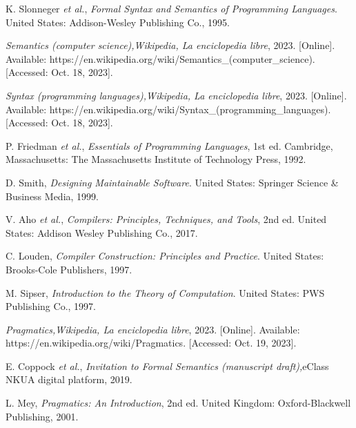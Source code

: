 \begin{thebibliography}{11}
    \label{sec:27}
    \hypertarget{27}{}
    K. Slonneger \textit{et al.}, \textit{Formal Syntax and Semantics of Programming Languages}. United States: Addison-Wesley Publishing Co., 1995.

    \label{sec:28}
    \hypertarget{28}{}
    \textit{Semantics (computer science),}\textit{Wikipedia, La enciclopedia libre}, 2023. [Online]. Available: https://en.wikipedia.org/wiki/Semantics\_(computer\_science). [Accessed: Oct. 18, 2023].

    \label{sec:29}
    \hypertarget{29}{}
    \textit{Syntax (programming languages),}\textit{Wikipedia, La enciclopedia libre}, 2023. [Online]. Available: https://en.wikipedia.org/wiki/Syntax\_(programming\_languages). [Accessed: Oct. 18, 2023].

    \label{sec:30}
    \hypertarget{30}{}
    P. Friedman \textit{et al.}, \textit{Essentials of Programming Languages}, 1st ed. Cambridge, Massachusetts: The Massachusetts Institute of Technology Press, 1992.

    \label{sec:31}
    \hypertarget{31}{}
    D. Smith, \textit{Designing Maintainable Software}. United States: Springer Science \& Business Media, 1999.

    \label{sec:32}
    \hypertarget{32}{}
    V. Aho \textit{et al.}, \textit{Compilers: Principles, Techniques, and Tools}, 2nd ed. United States: Addison Wesley Publishing Co., 2017.

    \label{sec:33}
    \hypertarget{33}{}
    C. Louden, \textit{Compiler Construction: Principles and Practice}. United States: Brooks-Cole Publishers, 1997.

    \label{sec:34}
    \hypertarget{34}{}
    M. Sipser, \textit{Introduction to the Theory of Computation}. United States: PWS Publishing Co., 1997.

    \label{sec:35}
    \hypertarget{35}{}
    \textit{Pragmatics,}\textit{Wikipedia, La enciclopedia libre}, 2023. [Online]. Available: https://en.wikipedia.org/wiki/Pragmatics. [Accessed: Oct. 19, 2023].

    \label{sec:36}
    \hypertarget{36}{}
    E. Coppock \textit{et al.}, \textit{Invitation to Formal Semantics (manuscript draft),}eClass NKUA digital platform, 2019.

    \label{sec:37}
    \hypertarget{37}{}
    L. Mey, \textit{Pragmatics: An Introduction}, 2nd ed. United Kingdom: Oxford-Blackwell Publishing, 2001.


\end{thebibliography}

